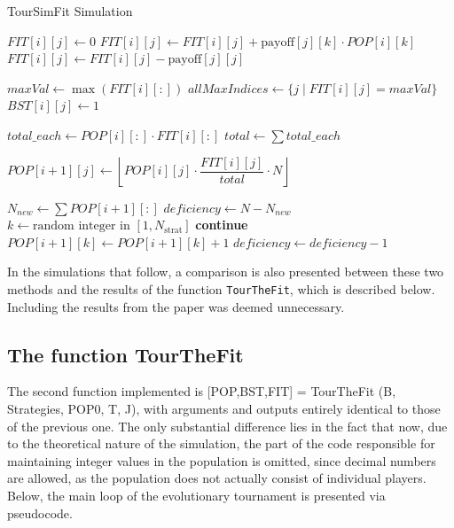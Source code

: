 \begin{algorithm}
\caption{TourSimFit Simulation}
\begin{algorithmic}[1]
        \STATE $FIT[i][j] \gets 0$
            \STATE $FIT[i][j] \gets FIT[i][j] + \text{payoff}[j][k] \cdot POP[i][k]$
        \ENDFOR
        \STATE $FIT[i][j] \gets FIT[i][j] - \text{payoff}[j][j]$
    \ENDFOR

    \STATE $maxVal \gets \max(FIT[i][:])$
    \STATE $allMaxIndices \gets \{j \mid FIT[i][j] = maxVal\}$
        \STATE $BST[i][j] \gets 1$
    \ENDFOR

    \STATE $total\_each \gets POP[i][:] \cdot FIT[i][:]$ 
    \STATE $total \gets \sum total\_each$

        \STATE $POP[i+1][j] \gets \left\lfloor POP[i][j] \cdot \dfrac{FIT[i][j]}{total} \cdot N \right\rfloor$
    \ENDFOR

        \STATE $N_{new} \gets \sum POP[i+1][:]$
        \STATE $deficiency \gets N - N_{new}$
            \STATE $k \gets \text{random integer in } [1, N_{\text{strat}}]$
                \STATE \textbf{continue}
            \ENDIF
            \STATE $POP[i+1][k] \gets POP[i+1][k] + 1$
            \STATE $deficiency \gets deficiency - 1$
        \ENDWHILE
    \ENDIF
\ENDFOR
\end{algorithmic}
\end{algorithm}
In the simulations that follow, a comparison is also presented between these two methods and the results of the function \texttt{TourTheFit}, which is described below. Including the results from the paper was deemed unnecessary.

\subsection{The function TourTheFit}
The second function implemented is [POP,BST,FIT]\- =\- TourTheFit\- (B,\- Strategies,\- POP0,\- T,\- J), with arguments and outputs entirely identical to those of the previous one. The only substantial difference lies in the fact that now, due to the theoretical nature of the simulation, the part of the code responsible for maintaining integer values in the population is omitted, since decimal numbers are allowed, as the population does not actually consist of individual players. Below, the main loop of the evolutionary tournament is presented via pseudocode.

